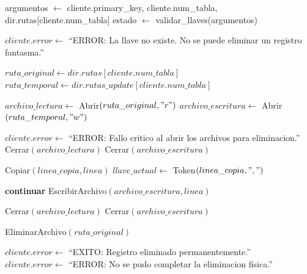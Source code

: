 \begin{tcolorbox}[colback=white, colframe=azul_unam, 
title=Pseudocódigo: insercion.c, breakable]
\begin{algorithmic}[1]


\State argumentos $\gets$ cliente.primary\_key, cliente.num\_tabla, dir.rutas[cliente.num\_tabla]
\State estado $\gets$ validar\_llaves(argumentos)

    \State $cliente.error \gets$ ``ERROR: La llave no existe. No se puede eliminar un registro fantasma.''
    \State \Return
\EndIf

\State $ruta\_original \gets dir.rutas[cliente.num\_tabla]$
\State $ruta\_temporal \gets dir.rutas\_update[cliente.num\_tabla]$

\State $archivo\_lectura \gets$ Abrir$(ruta\_original, "r")$
\State $archivo\_escritura \gets$ Abrir$(ruta\_temporal, "w")$

    \State $cliente.error \gets$ ``ERROR: Fallo critico al abrir los archivos para eliminacion.''
        \State Cerrar$(archivo\_lectura)$
    \EndIf
        \State Cerrar$(archivo\_escritura)$
    \EndIf
    \State \Return
\EndIf


    \State Copiar$(linea\_copia, linea)$
    \State $llave\_actual \gets$ Token$(linea\_copia, ",")$

        \State \textbf{continuar}
    \Else
        \State EscribirArchivo$(archivo\_escritura, linea)$
    \EndIf

\EndWhile

\State Cerrar$(archivo\_lectura)$
\State Cerrar$(archivo\_escritura)$

\State EliminarArchivo$(ruta\_original)$

    \State $cliente.error \gets$ ``EXITO: Registro eliminado permanentemente.''
\Else
    \State $cliente.error \gets$ ``ERROR: No se pudo completar la eliminacion fisica.''
\EndIf

\EndProcedure

\end{algorithmic}
\end{tcolorbox}


